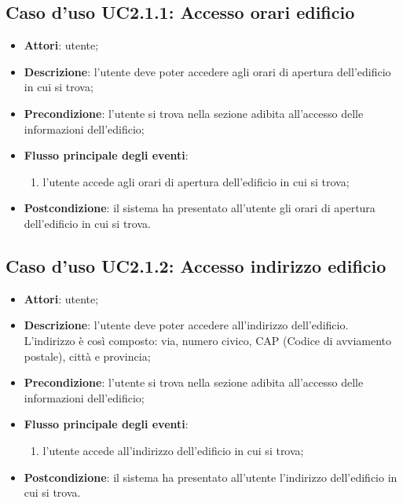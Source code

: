 \documentclass[../AnalisiDeiRequisiti.tex]{subfiles}
\begin{document}
\subsection{Caso d'uso UC2.1.1: Accesso orari edificio}
\begin{itemize}
\item \textbf{Attori}: utente;
\item \textbf{Descrizione}: l'utente deve poter accedere agli orari di apertura dell'edificio in cui si trova; 
      \item \textbf{Precondizione}: l'utente si trova nella sezione adibita all'accesso delle informazioni dell'edificio;

        \item \textbf{Flusso principale degli eventi}:
          \begin{enumerate}
          \item l'utente accede agli orari di apertura dell'edificio in cui si trova;

      \end{enumerate}
    \item \textbf{Postcondizione}: il sistema ha presentato all'utente gli orari di apertura dell'edificio in cui si trova.
  \end{itemize}
\hypertarget{UC2.1.2}{}
\subsection{Caso d'uso UC2.1.2: Accesso indirizzo edificio}
\begin{itemize}
\item \textbf{Attori}: utente;
\item \textbf{Descrizione}: l'utente deve poter accedere all'indirizzo dell'edificio. L'indirizzo è così composto: via, numero civico, CAP (Codice di avviamento postale), città e provincia; 
      \item \textbf{Precondizione}: l'utente si trova nella sezione adibita all'accesso delle informazioni dell'edificio;

        \item \textbf{Flusso principale degli eventi}:
          \begin{enumerate}
          \item l'utente accede all'indirizzo dell'edificio in cui si trova;

      \end{enumerate}
    \item \textbf{Postcondizione}: il sistema ha presentato all'utente l'indirizzo dell'edificio in cui si trova.
  \end{itemize}
\hypertarget{UC2.1.3}{}
\end{document}
